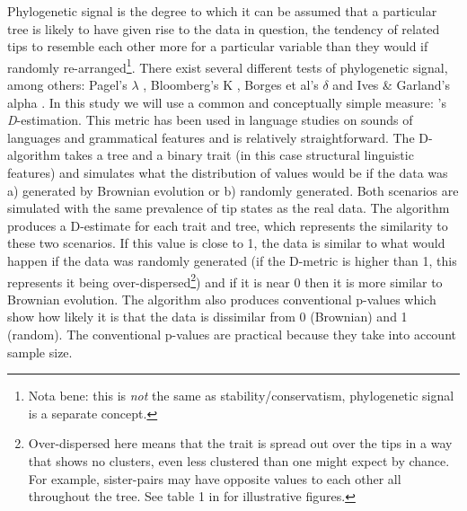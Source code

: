 \documentclass[12pt,letterpaper]{article}
\begin{document}
Phylogenetic signal is the degree to which it can be assumed that a particular tree is likely to have given rise to the data in question, the tendency of related tips to resemble each other more for a particular variable than they would if randomly re-arranged\footnote{Nota bene: this is \emph{not} the same as stability/conservatism, phylogenetic signal is a separate concept.}\citep[905]{blomberg2002tempo}. There exist several different tests of phylogenetic signal, among others: Pagel's $\lambda$ \citep{pagel1999inferring}, Bloomberg's K \citep{blomberg2003testing}, Borges et al's $\delta$ \citep{borges2019measuring} and Ives \& Garland's alpha \citep{ives2010phylogenetic}. In this study we will use a common and conceptually simple measure: \citet{fritz2010selectivity}'s \emph{D}-estimation. This metric has been used in language studies on sounds of languages \citep{macklin2021phylogenetic} and grammatical features \citep{hubler2022phylogenetic} and is relatively straightforward. The D-algorithm takes a tree and a binary trait (in this case structural linguistic features) and simulates what the distribution of values would be if the data was a) generated by Brownian evolution or b) randomly generated. Both scenarios are simulated with the same prevalence of tip states as the real data. The algorithm produces a D-estimate for each trait and tree, which represents the similarity to these two scenarios. If this value is close to 1, the data is similar to what would happen if the data was randomly generated (if the D-metric is higher than 1, this represents it being over-dispersed\footnote{Over-dispersed here means that the trait is spread out over the tips in a way that shows no clusters, even less clustered than one might expect by chance. For example, sister-pairs may have opposite values to each other all throughout the tree. See table 1 in \cite[1044]{fritz2010selectivity} for illustrative figures.}) and if it is near 0 then it is more similar to Brownian evolution. The algorithm also produces conventional p-values which show how likely it is that the data is dissimilar from 0 (Brownian) and 1 (random). The conventional p-values are practical because they take into account sample size. 
\end{document}
